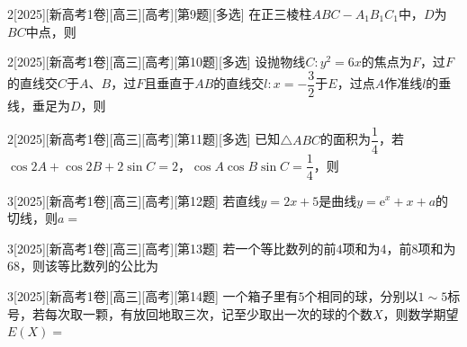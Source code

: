 \begin{example}{2}[2025][新高考1卷][高三][高考][第9题][多选]
在正三棱柱$ABC-A_1B_1C_1$中，$D$为$BC$中点，则\blankbox
\begin{choices}
\end{choices}
\end{example}

\begin{example}{2}[2025][新高考1卷][高三][高考][第10题][多选]
设抛物线$C:y^2=6x$的焦点为$F$，过$F$的直线交$C$于$A$、$B$，过$F$且垂直于$AB$的直线交$l:x=-\dfrac{3}{2}$于$E$，过点$A$作准线$l$的垂线，垂足为$D$，则\blankbox
\begin{choices}
\end{choices}
\end{example}

\begin{example}{2}[2025][新高考1卷][高三][高考][第11题][多选]
已知$\triangle ABC$的面积为$\dfrac{1}{4}$，若$\cos2A+\cos2B+2\sin C=2$，$\cos A\cos B\sin C=\dfrac{1}{4}$，则\blankbox
\begin{choices}
\end{choices}
\end{example}

\begin{example}{3}[2025][新高考1卷][高三][高考][第12题]
若直线$y=2x+5$是曲线$y=\text{e}^x+x+a$的切线，则$a=$\blankline
{}
\end{example}

\begin{example}{3}[2025][新高考1卷][高三][高考][第13题]
若一个等比数列的前$4$项和为$4$，前$8$项和为$68$，则该等比数列的公比为\blankline
{}
\end{example}

\begin{example}{3}[2025][新高考1卷][高三][高考][第14题]
一个箱子里有$5$个相同的球，分别以$1\sim5$标号，若每次取一颗，有放回地取三次，记至少取出一次的球的个数$X$，则数学期望$E(X)=$\blankline
{}
\end{example}

